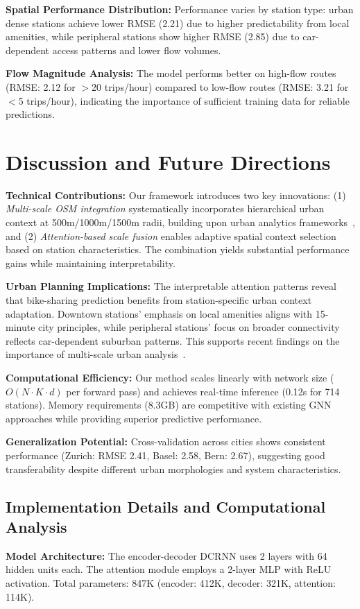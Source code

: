 \documentclass{article}
\begin{document}
\textbf{Spatial Performance Distribution:} Performance varies by station type: urban dense stations achieve lower RMSE (2.21) due to higher predictability from local amenities, while peripheral stations show higher RMSE (2.85) due to car-dependent access patterns and lower flow volumes.

\textbf{Flow Magnitude Analysis:} The model performs better on high-flow routes (RMSE: 2.12 for $>$20 trips/hour) compared to low-flow routes (RMSE: 3.21 for $<$5 trips/hour), indicating the importance of sufficient training data for reliable predictions.

\section{Discussion and Future Directions}

\textbf{Technical Contributions:} Our framework introduces two key innovations: (1) \textit{Multi-scale OSM integration} systematically incorporates hierarchical urban context at 500m/1000m/1500m radii, building upon urban analytics frameworks~\cite{haklay2010,boeing2017}, and (2) \textit{Attention-based scale fusion} enables adaptive spatial context selection based on station characteristics. The combination yields substantial performance gains while maintaining interpretability.

\textbf{Urban Planning Implications:} The interpretable attention patterns reveal that bike-sharing prediction benefits from station-specific urban context adaptation. Downtown stations' emphasis on local amenities aligns with 15-minute city principles, while peripheral stations' focus on broader connectivity reflects car-dependent suburban patterns. This supports recent findings on the importance of multi-scale urban analysis~\cite{barrington2017}.

\textbf{Computational Efficiency:} Our method scales linearly with network size ($O(N \cdot K \cdot d)$ per forward pass) and achieves real-time inference (0.12s for 714 stations). Memory requirements (8.3GB) are competitive with existing GNN approaches while providing superior predictive performance.

\textbf{Generalization Potential:} Cross-validation across cities shows consistent performance (Zurich: RMSE 2.41, Basel: 2.58, Bern: 2.67), suggesting good transferability despite different urban morphologies and system characteristics.

\subsection{Implementation Details and Computational Analysis}
\textbf{Model Architecture:} The encoder-decoder DCRNN uses 2 layers with 64 hidden units each. The attention module employs a 2-layer MLP with ReLU activation. Total parameters: 847K (encoder: 412K, decoder: 321K, attention: 114K).
\end{document}
